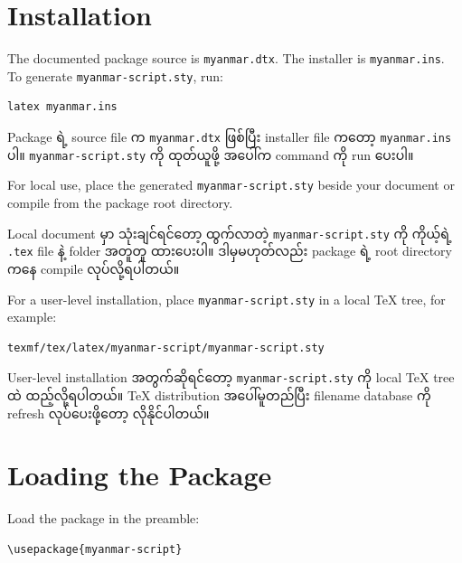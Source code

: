 \documentclass[a4paper,11pt]{article}
\newenvironment{burmese}
  {\par\smallskip\begin{myanmar}\sloppy}
  {\par\end{myanmar}\fussy\smallskip}
\begin{document}
\section{Installation}

The documented package source is \texttt{myanmar.dtx}. The installer is
\texttt{myanmar.ins}. To generate \texttt{myanmar-script.sty}, run:

\begin{Verbatim}
latex myanmar.ins
\end{Verbatim}

\begin{burmese}
Package ရဲ့ source file က \texttt{myanmar.dtx} ဖြစ်ပြီး installer file ကတော့ 
\texttt{myanmar.ins} ပါ။ \texttt{myanmar-script.sty} ကို ထုတ်ယူဖို့ အပေါ်က 
command ကို run ပေးပါ။
\end{burmese}

For local use, place the generated \texttt{myanmar-script.sty} beside your document or
compile from the package root directory.

\begin{burmese}
Local document မှာ သုံးချင်ရင်တော့ ထွက်လာတဲ့ \texttt{myanmar-script.sty} ကို 
ကိုယ့်ရဲ့ \texttt{.tex} file နဲ့ folder အတူတူ ထားပေးပါ။ ဒါမှမဟုတ်လည်း package ရဲ့ root 
directory ကနေ compile လုပ်လို့ရပါတယ်။
\end{burmese}

For a user-level installation, place \texttt{myanmar-script.sty} in a local TeX tree,
for example:

\begin{Verbatim}
texmf/tex/latex/myanmar-script/myanmar-script.sty
\end{Verbatim}

\begin{burmese}
User-level installation အတွက်ဆိုရင်တော့ \texttt{myanmar-script.sty} ကို local TeX tree 
ထဲ ထည့်လို့ရပါတယ်။ TeX distribution အပေါ်မူတည်ပြီး filename database ကို refresh 
လုပ်ပေးဖို့တော့ လိုနိုင်ပါတယ်။
\end{burmese}

\section{Loading the Package}

Load the package in the preamble:

\begin{Verbatim}
\usepackage{myanmar-script}
\end{Verbatim}
\end{document}
